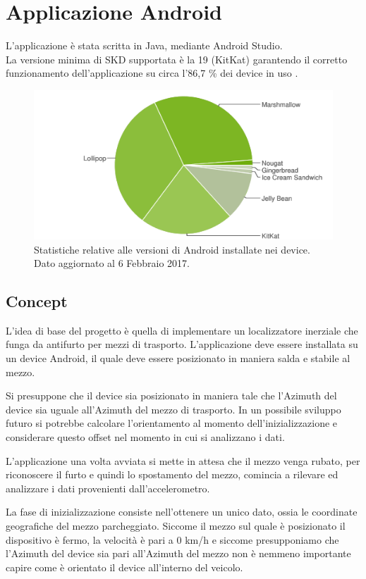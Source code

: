 \documentclass[12pt,a4paper,openright,twoside]{report}
\begin{document}
\section{Applicazione Android}
L'applicazione è stata scritta in Java, mediante Android Studio. \\
La versione minima di SKD supportata è la 19 (KitKat) garantendo il corretto funzionamento dell'applicazione su circa l'86,7 \% dei device in uso \cite{K17}.

\begin{figure}[h!]
\centering 
\includegraphics[scale=0.6]{fig11} 
\caption{Statistiche relative alle versioni di Android installate nei device. Dato aggiornato al 6 Febbraio 2017.} 
\end{figure}

\subsection{Concept}
L'idea di base del progetto è quella di implementare un localizzatore inerziale che funga da antifurto per mezzi di trasporto. L'applicazione deve essere installata su un device Android, il quale deve essere posizionato in maniera salda e stabile al mezzo.

Si presuppone che il device sia posizionato in maniera tale che l'Azimuth del device sia uguale all'Azimuth del mezzo di trasporto. In un possibile sviluppo futuro si potrebbe calcolare l'orientamento al momento dell'inizializzazione e considerare questo offset nel momento in cui si analizzano i dati.


L'applicazione una volta avviata si mette in attesa che il mezzo venga rubato, per riconoscere il furto e quindi lo spostamento del mezzo, comincia a rilevare ed analizzare i dati provenienti dall'accelerometro.

La fase di inizializzazione consiste nell'ottenere un unico dato, ossia le coordinate geografiche del mezzo parcheggiato. Siccome il mezzo sul quale è posizionato il dispositivo è fermo, la velocità è pari a 0 km/h e siccome presupponiamo che l'Azimuth del device sia pari all'Azimuth del mezzo non è nemmeno importante capire come è orientato il device all'interno del veicolo.
\end{document}
